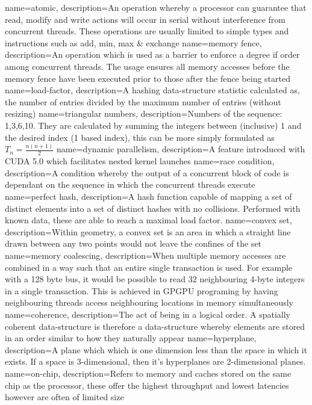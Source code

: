 {
  name=atomic,
  description={An operation whereby a processor can guarantee that read, modify and write actions will occur in serial without interference from concurrent threads. These operations are usually limited to simple types and instructions such as add, min, max \& exchange}
}
{
  name=memory fence,
  description={An operation which is used as a barrier to enforce a degree if order among concurrent threads. The usage ensures all memory accesses before the memory fence have been executed prior to those after the fence being started}
}
{
  name=load-factor,
  description={A hashing data-structure statistic calculated as, the number of entries divided by the maximum number of entries (without resizing)}
}
{
  name=triangular numbers,
  description={Numbers of the sequence: 1,3,6,10. They are calculated by summing the integers between (inclusive) 1 and the desired index (1 based index), this can be more simply formulated as $T_n=\frac{n(n+1)}{2}$}
}
{
  name=dynamic parallelism,
  description={A feature introduced with CUDA 5.0 which facilitates nested kernel launches}
}
{
  name=race condition,
  description={A condition whereby the output of a concurrent block of code is dependant on the sequence in which the concurrent threads execute}
}
{
  name=perfect hash,
  description={A hash function capable of mapping a set of distinct elements into a set of distinct hashes with no collisions. Performed with known data, these are able to reach a maximal load factor.}
}
{
  name=convex set,
  description={Within geometry, a convex set is an area in which a straight line drawn between any two points would not leave the confines of the set}
}
{
  name=memory coalescing,
  description={When multiple memory accesses are combined in a way such that an entire single transaction is used. For example with a 128 byte bus, it would be possible to read 32 neighbouring 4-byte integers in a single transaction. This is achieved in GPGPU programing by having neighbouring threads access neighbouring locations in memory simultaneously}
}
{
  name=coherence,
  description={The act of being in a logical order. A spatially coherent data-structure is therefore a data-structure whereby elements are stored in an order similar to how they naturally appear}
}
{
  name=hyperplane,
  description={A plane which which is one dimension less than the space in which it exists. If a space is 3-dimensional, then it's hyperplanes are 2-dimensional planes.}
}
{
  name=on-chip,
  description={Refers to memory and caches stored on the same chip as the processor, these offer the highest throughput and lowest latencies however are often of limited size}
}
